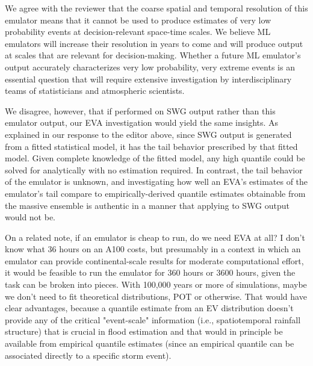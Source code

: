 \documentclass[12pt,english]{reviewresponse}
\begin{document}
\begin{revresponse}

We agree with the reviewer that the coarse spatial and temporal resolution of this emulator means that it cannot be used to produce estimates of very low probability events at decision-relevant space-time scales.  We believe ML emulators will increase their resolution in years to come and will produce output at scales that are relevant for decision-making.  Whether a future ML emulator's output accurately characterizes very low probability, very extreme events is an essential question that will require extensive investigation by interdisciplinary teams of statisticians and atmospheric scientists.

We disagree, however, that if performed on SWG output rather than this emulator output, our EVA investigation would yield the same insights.  As explained in our response to the editor above, since SWG output is generated from a fitted statistical model, it has the tail behavior prescribed by that fitted model.  Given complete knowledge of the fitted model, any high quantile could be solved for analytically with no estimation required.  In contrast, the tail behavior of the emulator is unknown, and investigating how well an EVA's estimates of the emulator's tail compare to empirically-derived quantile estimates obtainable from the massive ensemble is authentic in a manner that applying to SWG output would not be. 



\end{revresponse}



\begin{revcomment}
On a related note, if an emulator is cheap to run, do we need EVA at all? I don't know what 36 hours on an A100 costs, but presumably in a context in which an emulator can provide continental-scale results for moderate computational effort, it would be feasible to run the emulator for 360 hours or 3600 hours, given the task can be broken into pieces. With 100,000 years or more of simulations, maybe we don't need to fit theoretical distributions, POT or otherwise. That would have clear advantages, because a quantile estimate from an EV distribution doesn't provide any of the critical "event-scale" information (i.e., spatiotemporal rainfall structure) that is crucial in flood estimation and that would in principle be available from empirical quantile estimates (since an empirical quantile can be associated directly to a specific storm event).
\end{revcomment}
\end{document}
